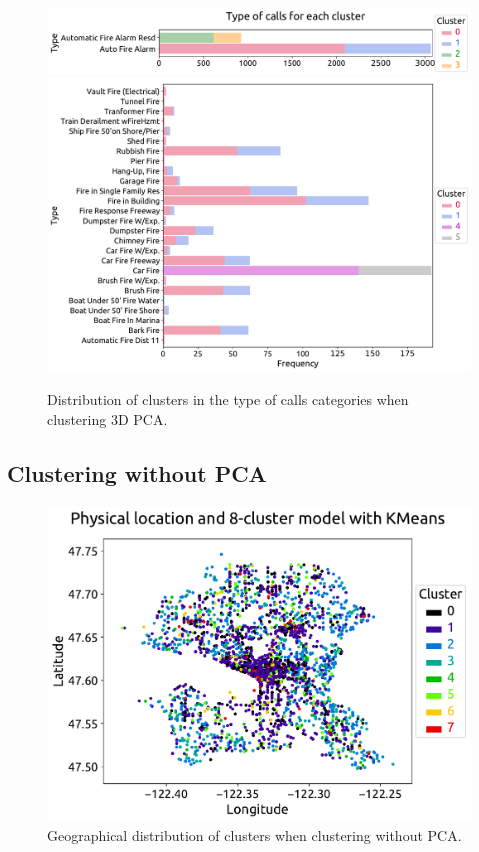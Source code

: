 \documentclass[12pt,a4paper]{article}
\begin{document}
\begin{figure}[ht!]
\centering
\includegraphics[scale=0.52]{figs/STORY_3D_PCA_type_1.pdf}
\includegraphics[scale=0.52]{figs/STORY_3D_PCA_type_2.pdf}
\caption{Distribution of clusters in the type of calls categories when clustering 3D PCA.}
\label{STORY_3D_PCA_type}
\end{figure}

\clearpage

\subsection{Clustering without PCA}

\begin{figure}[ht!]
\centering
\includegraphics[scale=0.6]{figs/STORY_NO_PCA_location.pdf}
\caption{Geographical distribution of clusters when clustering without PCA.}
\label{STORY_NO_PCA_location}
\end{figure}
\end{document}
